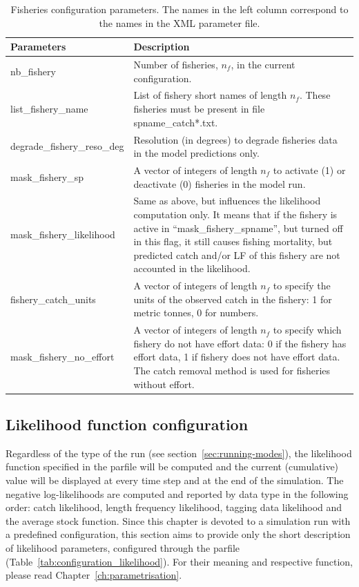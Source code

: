 \begin{table}[H]
\caption{Fisheries configuration parameters. The names in the left column correspond to the names in the XML parameter file.}
  \begin{tabular}{p{5.2cm}p{10.5cm}}
    \hline
    {\bfseries Parameters} & {\bfseries Description}\\ \hline\hline
    {\ttfamily nb\_fishery}  & Number of fisheries, $n_{f}$, in the current configuration.\\\hline
    {\ttfamily list\_fishery\_name} & List of fishery short names of length $n_f$. These fisheries must be present in file spname\_catch*.txt. \\\hline
    {\ttfamily degrade}\_{\ttfamily fishery}\_{\ttfamily reso}\_{\ttfamily deg} & Resolution (in degrees) to degrade fisheries data in the model predictions only.\\\hline
    {\ttfamily mask\_fishery\_sp}  & A vector of integers of length $n_f$ to activate (1) or deactivate (0) fisheries in the model run. \\\hline
    {\ttfamily mask}\_{\ttfamily fishery}\_{\ttfamily likelihood} & Same as above, but influences the likelihood computation only. It means that if the fishery is active in ``mask\_fishery\_spname'', but turned off in this flag, it still causes fishing mortality, but predicted catch and/or LF of this fishery are not accounted in the likelihood. \\\hline
    {\ttfamily fishery\_catch\_units} & A vector of integers of length $n_f$ to specify the units of the observed catch in the fishery: 1 for metric tonnes, 0 for numbers. \\\hline
    {\ttfamily mask\_fishery\_no\_effort}  & A vector of integers of length $n_f$ to specify which fishery do not have effort data: 0 if the fishery has effort data, 1 if fishery does not have effort data. The catch removal method is used for fisheries without effort. \\\hline
\end{tabular}
\label{tab:configuration_fishery}
\end{table}

\subsection{Likelihood function configuration} \label{sec:config-likelihood}

Regardless of the type of the run (see section~\ref{sec:running-modes}), the likelihood function specified in the parfile will be computed and the current (cumulative) value will be displayed at every time step and at the end of the simulation. The negative log-likelihoods are computed and reported by data type in the following order: catch likelihood, length frequency likelihood, tagging data likelihood and the average stock function. Since this chapter is devoted to a simulation run with a predefined configuration, this section aims to provide only the short description of likelihood parameters, configured through the parfile (Table~\ref{tab:configuration_likelihood}). For their meaning and respective function, please read Chapter~\ref{ch:parametrisation}.

